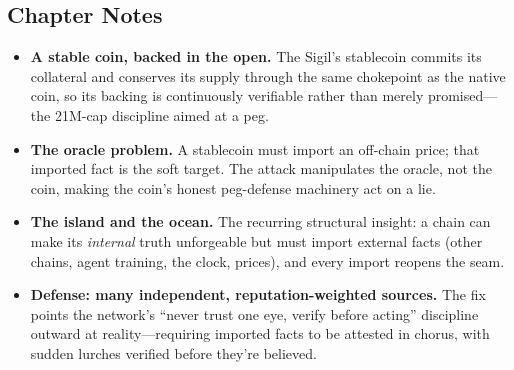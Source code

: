 \hypertarget{chapter-19-notes}{%
\subsection{Chapter Notes}\label{chapter-19-notes}}

\begin{itemize}
\tightlist
\item
  \textbf{A stable coin, backed in the open.} The Sigil's stablecoin commits its
  collateral and conserves its supply through the same chokepoint as the native
  coin, so its backing is continuously verifiable rather than merely promised---the
  21M-cap discipline aimed at a peg.
\item
  \textbf{The oracle problem.} A stablecoin must import an off-chain price; that
  imported fact is the soft target. The attack manipulates the oracle, not the
  coin, making the coin's honest peg-defense machinery act on a lie.
\item
  \textbf{The island and the ocean.} The recurring structural insight: a chain can
  make its \emph{internal} truth unforgeable but must import external facts (other
  chains, agent training, the clock, prices), and every import reopens the seam.
\item
  \textbf{Defense: many independent, reputation-weighted sources.} The fix points
  the network's ``never trust one eye, verify before acting'' discipline outward at
  reality---requiring imported facts to be attested in chorus, with sudden lurches
  verified before they're believed.
\end{itemize}
